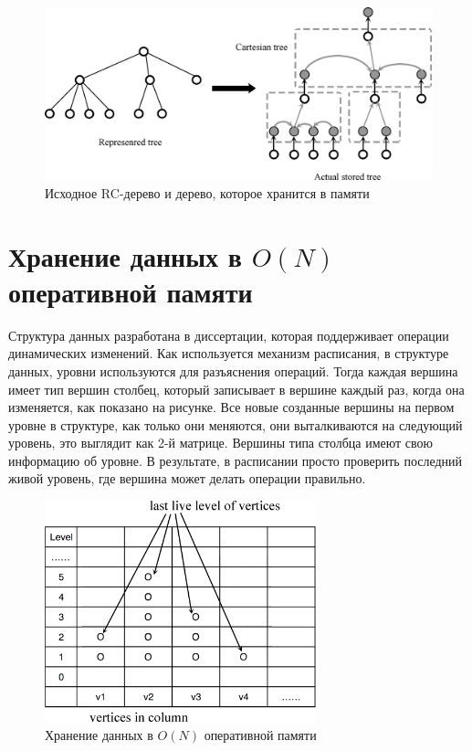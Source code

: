 \documentclass[specification,annotation,times]{itmo-student-thesis}
\newcommand{\revise}[1]{{\color{red!70!black} #1 }}
\begin{document}
\begin{figure}[!ht]
\centering
\includegraphics[width=1.0\textwidth]{pic/represented_tree_and_actual_stored_tree.png}
\caption{Исходное RC-дерево и дерево, которое хранится в памяти}\label{fig:represented}
\end{figure}


\section{Хранение данных в $O(N)$ оперативной памяти}

\revise{
Структура данных разработана в диссертации, которая поддерживает операции динамических изменений. Как используется механизм расписания, в структуре данных, уровни используются для разъяснения операций. 
Тогда каждая вершина имеет тип вершин столбец, который записывает в вершине каждый раз, когда она изменяется, как показано на рисунке. Все новые созданные вершины на первом уровне в структуре, как только 
они меняются, они выталкиваются на следующий уровень, это выглядит как 2-й матрице. Вершины типа столбца имеют свою информацию об уровне. В результате, в расписании просто проверить последний живой 
уровень, где вершина может делать операции правильно.
}

\begin{figure}[!ht]
\centering
\includegraphics[width=0.7\textwidth]{pic/vertices_in_column.png}
\caption{Хранение данных в $O(N)$ оперативной памяти}\label{fig:memory}
\end{figure}
\end{document}
